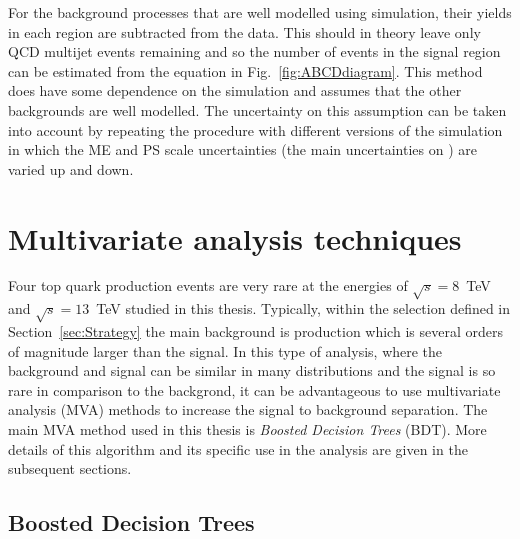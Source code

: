 For the background processes that are well modelled using simulation, their yields in each region are subtracted from the data. This should in theory leave only QCD multijet events remaining and so the number of events in the signal region can be estimated from the equation in Fig.~\ref{fig:ABCDdiagram}. This method does have some dependence on the simulation and assumes that the other backgrounds are well modelled. The uncertainty on this assumption can be taken into account by repeating the procedure with different versions of the \ttbar simulation in which the ME and PS scale uncertainties (the main uncertainties on \ttbar) are varied up and down.


\section{Multivariate analysis techniques ~\label{sec:MVAtechniques}}

Four top quark production events are very rare at the energies of $\sqrt{s} = 8$~TeV and $\sqrt{s} = 13$~TeV studied in this thesis. Typically, within the selection defined in Section~\ref{sec:Strategy} the main background is \ttbar production which is several orders of magnitude larger than the \tttt signal. In this type of analysis, where the background and signal can be similar in many distributions and the signal is so rare in comparison to the backgrond, it can be advantageous to use multivariate analysis (MVA) methods to increase the signal to background separation. The main MVA method used in this thesis is \emph{Boosted Decision Trees} (BDT). More details of this algorithm and its specific use in the analysis are given in the subsequent sections.


\subsection{Boosted Decision Trees}
\label{sec:BDT}

